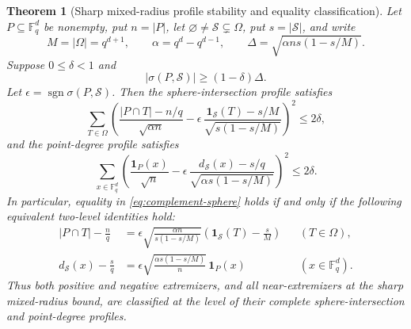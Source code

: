 \documentclass[11pt,letterpaper]{amsart}
\newtheorem{theorem}{Theorem}[section]
\theoremstyle{definition}
\theoremstyle{remark}
\newcommand{\1}{\mathbf 1}
\begin{document}
\begin{theorem}[Sharp mixed-radius profile stability and equality classification]\label{thm:mixed-profile}
Let $P\subseteq\mathbb F_q^d$ be nonempty, put $n=|P|$, let $\varnothing\ne\mathcal S\subsetneq\Omega$, put $s=|\mathcal S|$, and write
\[
 M=|\Omega|=q^{d+1},
 \qquad
 \alpha=q^d-q^{d-1},
 \qquad
 \Delta=\sqrt{\alpha n s(1-s/M)}.
\]
Suppose $0\le\delta<1$ and
\begin{equation}\label{eq:mixed-near-equality}
 |\sigma(P,\mathcal S)|\ge(1-\delta)\Delta.
\end{equation}
Let $\epsilon=\operatorname{sgn}\sigma(P,\mathcal S)$.  Then the sphere-intersection profile satisfies
\begin{equation}\label{eq:mixed-sphere-profile}
 \sum_{T\in\Omega}
 \left(
 \frac{|P\cap T|-n/q}{\sqrt{\alpha n}}
 -\epsilon\,
 \frac{\1_{\mathcal S}(T)-s/M}{\sqrt{s(1-s/M)}}
 \right)^2
 \le2\delta,
\end{equation}
and the point-degree profile satisfies
\begin{equation}\label{eq:mixed-point-profile}
 \sum_{x\in\mathbb F_q^d}
 \left(
 \frac{\1_P(x)}{\sqrt n}
 -\epsilon\,
 \frac{d_{\mathcal S}(x)-s/q}
 {\sqrt{\alpha s(1-s/M)}}
 \right)^2
 \le2\delta.
\end{equation}
In particular, equality in \eqref{eq:complement-sphere} holds if and only if the following equivalent two-level identities hold:
\begin{align}
 |P\cap T|-\frac nq
 &=\epsilon\sqrt{\frac{\alpha n}{s(1-s/M)}}
 \left(\1_{\mathcal S}(T)-\frac sM\right)
 &&(T\in\Omega),\label{eq:mixed-equality-spheres}\\
 d_{\mathcal S}(x)-\frac sq
 &=\epsilon\sqrt{\frac{\alpha s(1-s/M)}n}\,\1_P(x)
 &&(x\in\mathbb F_q^d).\label{eq:mixed-equality-points}
\end{align}
Thus both positive and negative extremizers, and all near-extremizers at the sharp mixed-radius bound, are classified at the level of their complete sphere-intersection and point-degree profiles.
\end{theorem}
\end{document}
